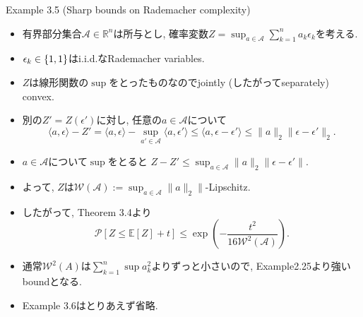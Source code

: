 \documentclass[aspectratio=169, dvipdfmx]{beamer}
\newcommand{\ex}{\mathbb{E}}
\begin{document}
\begin{frame}
\begin{exampleblock}{Example 3.5 (Sharp bounds on Rademacher complexity)}
    \begin{itemize}
        \item 有界部分集合$\mathcal{A}\in\mathbb{R}^n$は所与とし,
        確率変数$Z = \sup_{a\in\mathcal{A}}\sum_{k=1}^na_k\epsilon_k$を考える.
        \item $\epsilon_k \in \{\-1,1\}$はi.i.d.なRademacher variables.
        \item $Z$は線形関数の$\sup$をとったものなのでjointly (したがってseparately) convex.
        \item 別の$Z' = Z(\epsilon')$に対し, 任意の$a\in\mathcal{A}$について
        \[
            \langle a,\epsilon\rangle - Z'
            = \langle a,\epsilon\rangle - \sup_{a'\in\mathcal{A}}\langle a,\epsilon'\rangle
            \le \langle a, \epsilon-\epsilon'\rangle
            \le \|a\|_2 \|\epsilon-\epsilon'\|_2.
        \]
        \item $a\in \mathcal{A}$について$\sup$をとると
        $Z-Z' \le \sup_{a\in\mathcal{A}}\|a\|_2\|\epsilon-\epsilon'\|$.
        \item よって, $Z$は$\mathcal{W}(\mathcal{A}):=\sup_{a\in\mathcal{A}}\|a\|_2\|$-Lipschitz.
        \item したがって, Theorem 3.4より
        \[ \mathcal{P}[Z \le \ex[Z]+t] \le \exp\left(-\frac{t^2}{16\mathcal{W}^2(\mathcal{A})}\right).
        \tag{3.17}\label{3.17}\]
        \item 通常$\mathcal{W}^2(A)$は$\sum_{k=1}^n\sup a_k^2$よりずっと小さいので, Example2.25より強いboundとなる.
    \end{itemize}
\end{exampleblock}
\end{frame}

\begin{frame}
\begin{itemize}
    \item Example 3.6はとりあえず省略.
\end{itemize}
\end{frame}
\end{document}
